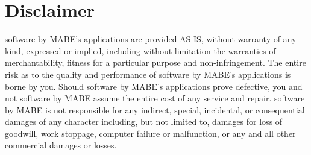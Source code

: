 \documentclass[12pt,a4]{article}
\begin{document}
\section{Disclaimer}
\label{disclaimer}
\medskip
software by MABE's applications are provided AS IS, without warranty of any kind, expressed or implied, including without limitation the warranties of merchantability, fitness for a particular purpose and non-infringement. The entire risk as to the quality and performance of software by MABE's applications is borne by you. Should software by MABE's applications prove defective, you and not software by MABE assume the entire cost of any service and repair. software by MABE is not responsible for any indirect, special, incidental, or consequential damages of any character including, but not limited to, damages for loss of goodwill, work stoppage, computer failure or malfunction, or any and all other commercial damages or losses.
\end{document}
